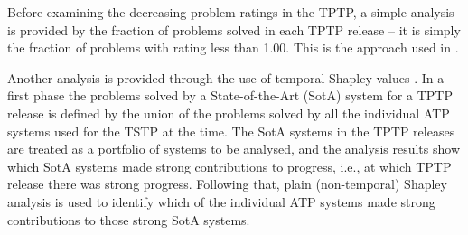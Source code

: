\documentclass[runningheads]{llncs}
\begin{document}

Before examining the decreasing problem ratings in the TPTP, a simple analysis is provided
by the fraction of problems solved in each TPTP release -- it is simply the fraction of 
problems with rating less than 1.00.
This is the approach used in \cite{SSP21}.

Another analysis is provided through the use of temporal Shapley values \cite{KF+19}.
In a first phase the problems solved by a State-of-the-Art (SotA) system for a TPTP release is 
defined by the union of the problems solved by all the individual ATP systems used for the TSTP 
at the time.
The SotA systems in the TPTP releases are treated as a portfolio of systems to be analysed, and 
the analysis results show which SotA systems made strong contributions to progress, i.e., at
which TPTP release there was strong progress.
Following that, plain (non-temporal) Shapley analysis \cite{FK+16} is used to identify which
of the individual ATP systems made strong contributions to those strong SotA systems.
\end{document}
